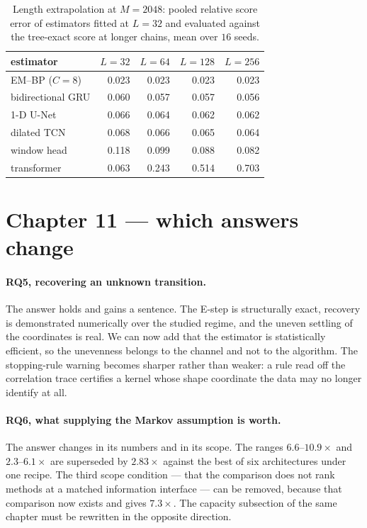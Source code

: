 \documentclass[11pt,a4paper]{article}
\begin{document}
\begin{table}[htbp]
\centering
\small
\caption{Length extrapolation at $M=2048$: pooled relative score error of estimators fitted at
$L=32$ and evaluated against the tree-exact score at longer chains, mean over $16$ seeds.}
\label{tab:length}
\begin{tabular}{l dddd}
\toprule
estimator & $L=32$ & $L=64$ & $L=128$ & $L=256$ \\
\midrule
EM--BP ($C=8$)     & 0.023 & 0.023 & 0.023 & 0.023 \\
bidirectional GRU  & 0.060 & 0.057 & 0.057 & 0.056 \\
1-D U-Net          & 0.066 & 0.064 & 0.062 & 0.062 \\
dilated TCN        & 0.068 & 0.066 & 0.065 & 0.064 \\
window head        & 0.118 & 0.099 & 0.088 & 0.082 \\
transformer        & 0.063 & 0.243 & 0.514 & 0.703 \\
\bottomrule
\end{tabular}
\end{table}

\section{Chapter 11 --- which answers change}\label{sec:ch11}

\paragraph{RQ5, recovering an unknown transition.}
The answer holds and gains a sentence. The E-step is structurally exact, recovery is demonstrated
numerically over the studied regime, and the uneven settling of the coordinates is real. We can now
add that the estimator is statistically efficient, so the unevenness belongs to the channel and not
to the algorithm. The stopping-rule warning becomes sharper rather than weaker: a rule read off the
correlation trace certifies a kernel whose shape coordinate the data may no longer identify at all.

\paragraph{RQ6, what supplying the Markov assumption is worth.}
The answer changes in its numbers and in its scope. The ranges $6.6$--$10.9\times$ and
$2.3$--$6.1\times$ are superseded by $2.83\times$ against the best of six architectures under one
recipe. The third scope condition --- that the comparison does not rank methods at a matched
information interface --- can be removed, because that comparison now exists and gives
$7.3\times$. The capacity subsection of the same chapter must be rewritten in the opposite
direction.
\end{document}
